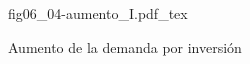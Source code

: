 \begin{figure}[h]
\centering
\def\svgwidth{0.5\textwidth}
{fig06_04-aumento_I.pdf_tex}
\caption{Aumento de la demanda por inversión}
\label{fig06_04-aumento_I}
\end{figure}